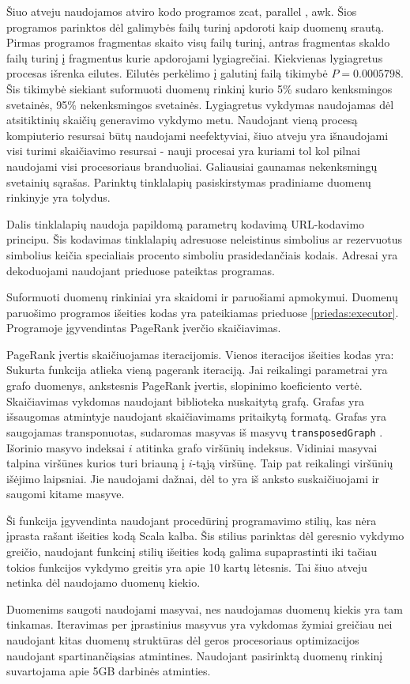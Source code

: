 Šiuo atveju naudojamos atviro kodo programos zcat, parallel \cite{parallel}, awk. Šios programos parinktos
dėl galimybės failų turinį apdoroti kaip duomenų srautą.   Pirmas programos fragmentas skaito visų failų turinį,
antras fragmentas skaldo failų turinį į fragmentus kurie apdorojami lygiagrečiai. Kiekvienas lygiagretus procesas
išrenka eilutes. Eilutės perkėlimo į galutinį failą tikimybė $P = 0.0005798$. Šis tikimybė siekiant suformuoti
duomenų rinkinį kurio 5\% sudaro kenksmingos svetainės, 95\% nekenksmingos svetainės. Lygiagretus vykdymas
naudojamas dėl atsitiktinių skaičių generavimo vykdymo metu. Naudojant vieną procesą kompiuterio resursai būtų
naudojami neefektyviai, šiuo atveju yra išnaudojami visi turimi skaičiavimo resursai - nauji procesai yra
kuriami tol kol pilnai naudojami visi procesoriaus branduoliai. Galiausiai gaunamas nekenksmingų svetainių
sąrašas. Parinktų tinklalapių pasiskirstymas pradiniame duomenų rinkinyje yra tolydus.

Dalis tinklalapių naudoja papildomą parametrų kodavimą URL-kodavimo principu. Šis kodavimas tinklalapių adresuose
neleistinus simbolius ar rezervuotus simbolius keičia specialiais procento simboliu prasidedančiais kodais.
Adresai yra dekoduojami naudojant prieduose pateiktas programas.


Suformuoti duomenų rinkiniai yra skaidomi ir paruošiami apmokymui. Duomenų paruošimo programos išeities
kodas yra pateikiamas prieduose \ref{priedas:executor}. Programoje įgyvendintas PageRank įverčio skaičiavimas.

PageRank įvertis skaičiuojamas iteracijomis. Vienos iteracijos išeities kodas yra:
Sukurta funkcija atlieka vieną pagerank iteraciją. Jai reikalingi  parametrai yra grafo duomenys, ankstesnis
PageRank įvertis, slopinimo koeficiento vertė. Skaičiavimas vykdomas naudojant biblioteka \cite{webgraph} nuskaitytą
grafą. Grafas yra išsaugomas atmintyje naudojant skaičiavimams pritaikytą formatą. Grafas yra saugojamas
transponuotas, sudaromas masyvas iš masyvų \texttt{transposedGraph} . Išorinio masyvo indeksai $i$ atitinka
grafo viršūnių indeksus. Vidiniai masyvai talpina viršūnes kurios turi briauną į $i$-tąją viršūnę. Taip pat
reikalingi viršūnių išėjimo laipsniai. Jie naudojami dažnai, dėl to yra iš anksto suskaičiuojami ir saugomi kitame masyve.

Ši funkcija įgyvendinta naudojant procedūrinį programavimo stilių, kas nėra įprasta rašant išeities kodą Scala
kalba. Šis stilius parinktas dėl geresnio vykdymo greičio, naudojant funkcinį stilių išeities kodą galima
supaprastinti iki
tačiau tokios funkcijos vykdymo greitis yra apie 10 kartų lėtesnis. Tai šiuo atveju netinka dėl naudojamo duomenų kiekio.

Duomenims saugoti naudojami masyvai, nes naudojamas duomenų kiekis yra tam tinkamas. Iteravimas per
įprastinius masyvus yra vykdomas žymiai greičiau nei naudojant kitas duomenų struktūras dėl geros
procesoriaus optimizacijos naudojant spartinančiąsias atmintines. Naudojant pasirinktą duomenų
rinkinį suvartojama apie 5GB darbinės atminties.